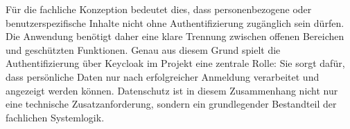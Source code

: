 Für die fachliche Konzeption bedeutet dies, dass personenbezogene oder benutzerspezifische Inhalte nicht ohne Authentifizierung zugänglich sein dürfen. Die Anwendung benötigt daher eine klare Trennung zwischen offenen Bereichen und geschützten Funktionen. Genau aus diesem Grund spielt die Authentifizierung über Keycloak im Projekt eine zentrale Rolle: Sie sorgt dafür, dass persönliche Daten nur nach erfolgreicher Anmeldung verarbeitet und angezeigt werden können. Datenschutz ist in diesem Zusammenhang nicht nur eine technische Zusatzanforderung, sondern ein grundlegender Bestandteil der fachlichen Systemlogik.

